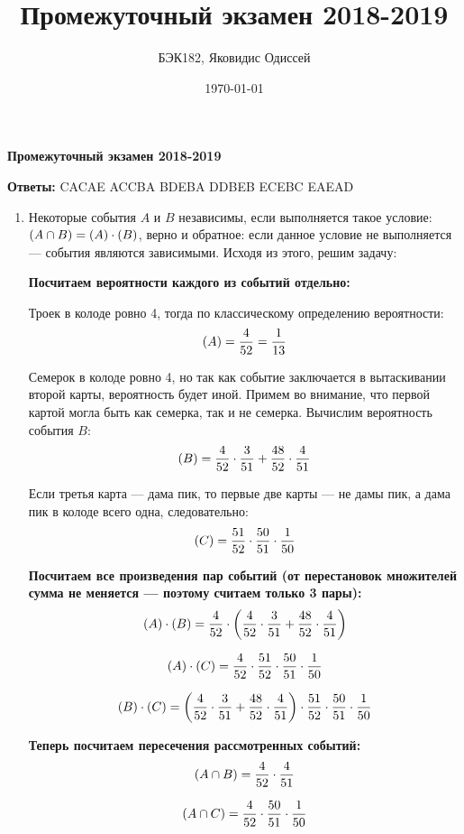 \documentclass[a4paper]{article} %
\title{Промежуточный экзамен 2018-2019}
\author{БЭК182, Яковидис Одиссей}
\date{\today}
\let\P\relax
\DeclareMathOperator{\P}{\mathbb{P}}
\begin{document}
\maketitle

\textbf{Промежуточный экзамен 2018-2019}

\textbf{Ответы:}
CACAE ACCBA BDEBA DDBEB ECEBC EAEAD


\begin{enumerate}

    \item
    Некоторые события $A$ и $B$ независимы, если выполняется такое условие:
    $ \P(A \cap B) = \P(A) \cdot \P(B) $, верно и обратное: если данное условие не выполняется — события являются зависимыми. Исходя из этого, решим задачу:
    
    \textbf{Посчитаем вероятности каждого из событий отдельно:}
    
    Троек в колоде ровно 4, тогда по классическому определению вероятности:
    \[ 
    \P(A) = \frac{4}{52} = \frac{1}{13} 
    \]
    
    Семерок в колоде ровно 4, но так как событие заключается в вытаскивании второй карты, вероятность будет иной.
    Примем во внимание, что первой картой могла быть как семерка, так и не семерка.
    Вычислим вероятность события $B$: 
    \[
    \P(B) = \frac{4}{52}\cdot\frac{3}{51} + \frac{48}{52}\cdot\frac{4}{51} 
    \]
    
    Если третья карта — дама пик, то первые две карты — не дамы пик, а дама пик в колоде всего одна, следовательно:
    \[ 
    \P(C) = \frac{51}{52}\cdot\frac{50}{51}\cdot\frac{1}{50} 
    \]
    
    \textbf{Посчитаем все произведения пар событий (от перестановок множителей сумма не меняется — поэтому считаем только 3 пары):}
    \[
    \P(A) \cdot \P(B) = \frac{4}{52}\cdot \left(\frac{4}{52}\cdot\frac{3}{51} + \frac{48}{52}\cdot\frac{4}{51} \right) 
    \]
    
    \[
    \P(A) \cdot \P(C) = \frac{4}{52}\cdot\frac{51}{52}\cdot\frac{50}{51}\cdot\frac{1}{50} 
    \]
    
    \[
    \P(B) \cdot \P(C) = \left(\frac{4}{52}\cdot\frac{3}{51} + \frac{48}{52}\cdot\frac{4}{51}\right)\cdot\frac{51}{52}\cdot\frac{50}{51}\cdot\frac{1}{50}
    \]
    
    \textbf{Теперь посчитаем пересечения рассмотренных событий:}
    \[
    \P(A \cap B) = \frac{4}{52}\cdot\frac{4}{51}
    \]
    
    \[
    \P(A \cap C) = \frac{4}{52}\cdot\frac{50}{51}\cdot\frac{1}{50} 
    \]
    

\end{enumerate}
\end{document}
